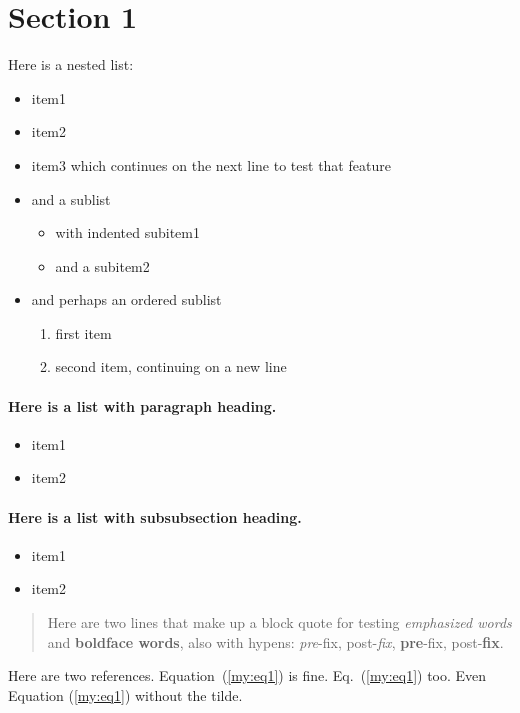 \documentclass[%
oneside,                 %
final,                   %
10pt]{article}
\theoremstyle{definition}
\begin{document}
\section{Section 1}
\label{sec1}
Here is a nested list:
\begin{itemize}
  \item item1
  \item item2
  \item item3 which continues on the next line to test that feature
  \item and a sublist
\begin{itemize}
    \item with indented subitem1
    \item and a subitem2
\end{itemize}
\noindent
  \item and perhaps an ordered sublist
\begin{enumerate}
   \item first item
   \item second item, continuing on a new line
\end{enumerate}
\noindent
\end{itemize}
\noindent
\paragraph{Here is a list with paragraph heading.}
\begin{itemize}
  \item item1
  \item item2
\end{itemize}
\noindent
\paragraph{Here is a list with subsubsection heading.}
\begin{itemize}
  \item item1
  \item item2
\end{itemize}
\noindent

\begin{quote}
Here are two lines that make up
a block quote for testing \emph{emphasized words} and \textbf{boldface words},
also with hypens:
\emph{pre}-fix, post-\emph{fix}, \textbf{pre}-fix, post-\textbf{fix}.
\end{quote}

Here are two references. Equation~(\ref{my:eq1}) is fine. Eq.~(\ref{my:eq1}) too.
Even Equation (\ref{my:eq1}) without the tilde.
\end{document}
